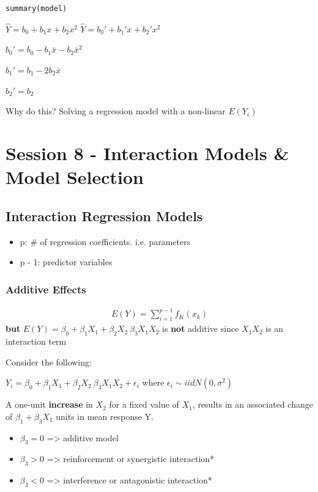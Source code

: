 \documentclass[11pt]{article}
\begin{document}
\begin{verbatim}
summary(model)
\end{verbatim}

\(\hat{Y} =  b_0 + b_1 x + b_2 x^2\)
\(\hat{Y} =  b_0' + b_1' x + b_2' x^2\)

\(b_0' = b_0 - b_1 \bar{x} - b_2 \bar{x}^2\)

\(b_1' = b_1 - 2 b_2 \bar{x}\)

\(b_2' = b_2\)

Why do this? Solving a regression model with a non-linear \(E(Y_i)\)
\section{Session 8 - Interaction Models \& Model Selection}
\label{sec:org156162c}
\subsection{Interaction Regression Models}
\label{sec:org8527358}
\begin{itemize}
\item p: \# of regression coefficients. i.e. parameters
\item p - 1: predictor variables
\end{itemize}

\subsubsection{Additive Effects}
\label{sec:orgd9edbe9}
\begin{equation}
\begin{split}
E(Y) = \sum_{i = 1}^{p - 1} f_K(x_k)
\end{split}
\end{equation}
\textbf{but} \(E(Y) = \beta_0 + \beta_1 X_1 + \beta_2 X_2 \ \beta_3 X_1 X_2\) is \textbf{not}
 additive since \(X_1 X_2\) is an interaction term

Consider the following:

\(Y_i = \beta_0 + \beta_1 X_1 + \beta_2 X_2 \ \beta_3 X_1 X_2 + \epsilon_i\) where
\(\epsilon_i \sim iid N(0, \sigma^2)\)

A one-unit \textbf{increase} in \(X_2\) for a fixed value of \(X_1\), results in an
associated change of \(\beta_1 + \beta_3 X_1\) units in mean response Y.

\begin{itemize}
\item \(\beta_3 = 0\) => additive model
\item \(\beta_3 > 0\) => reinforcement or synergistic interaction*
\item \(\beta_3 < 0\) => interference or antagonistic interaction*
\end{itemize}
\end{document}
